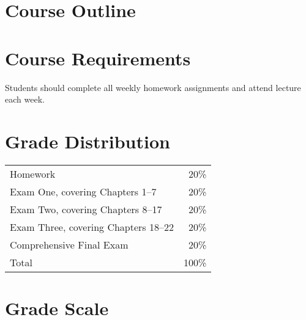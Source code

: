 \documentclass[letterpaper, landscape]{article}
\begin{document}
  



  \section{Course Outline}

  

  \section{Course Requirements}

  Students should complete all weekly homework assignments and attend lecture each week.
  \section{Grade Distribution} %

  \begin{tabular}{lr}
    \toprule
    Homework                             & 20\% \\
    Exam One, covering Chapters 1--7     & 20\% \\
    Exam Two, covering Chapters 8--17    & 20\% \\
    Exam Three, covering Chapters 18--22 & 20\% \\
    Comprehensive Final Exam             & 20\% \\
    \midrule
    Total                                                    & 100\% \\
    \bottomrule
  \end{tabular}

  \section{Grade Scale} %
  
\end{document}
